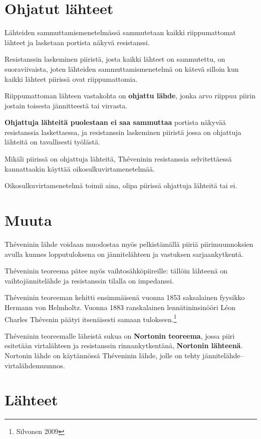 \documentclass[twocolumn]{article}
\begin{document}
\section{Ohjatut lähteet}\label{ohjatut}

Lähteiden sammuttamismenetelmässä sammutetaan kaikki riippumattomat lähteet ja lasketaan portista näkyvä resistanssi.

Resistanssin laskeminen piiristä, josta kaikki lähteet on sammutettu, on suoraviivaista, joten lähteiden sammuttamismenetelmä on kätevä silloin kun kaikki lähteet piirissä ovat riippumattomia.

Riippumattoman lähteen vastakohta on {\bf ohjattu lähde}, jonka arvo riippuu piirin jostain toisesta jännitteestä tai virrasta.

{\bf Ohjattuja lähteitä puolestaan ei saa sammuttaa} portista näkyvää resistanssia laskettaessa, ja resistanssin laskeminen piiristä jossa on ohjattuja lähteitä on tavallisesti työlästä.

Mikäli piirissä on ohjattuja lähteitä, Théveninin resistanssia selvitettäessä kannattaakin käyttää oikosulkuvirtamenetelmää.

Oikosulkuvirtamenetelmä toimii aina, olipa piirissä ohjattuja lähteitä tai ei.

\section{Muuta}

Théveninin lähde voidaan muodostaa myös pelkistämällä piiriä piirimuunnoksien avulla kunnes lopputuloksena on jännitelähteen ja vastuksen sarjaankytkentä.

Théveninin teoreema pätee myös vaihtosähköpiireille: tällöin lähteenä on vaihtojännitelähde ja resistanssin tilalla on impedanssi.

Théveninin teoreeman kehitti ensimmäisenä vuonna 1853 saksalainen fyysikko Hermann von Helmholtz. Vuonna 1883 ranskalainen lennätininsinööri Léon Charles Thévenin päätyi itsenäisesti samaan tulokseen.\footnote{Silvonen 2009}

Théveninin teoreemalle läheistä sukua on {\bf Nortonin teoreema}, jossa piiri esitetään virtalähteen ja resistanssin rinnankytkentänä, {\bf Nortonin lähteenä}. Nortonin lähde on käytännössä Théveninin lähde, jolle on tehty jännitelähde--virtalähdemuunnos.


\section{Lähteet}
\end{document}

